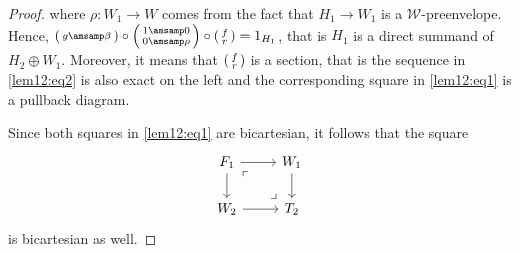 \begin{proof}
  where $\rho:W_1\to W$ comes from the fact that $H_1\to W_1$ is a $\mathcal{W}$-preenvelope. Hence,
  $
    \begin{psmallmatrix}
      g\amsamp \beta
    \end{psmallmatrix}
    \circ
    \begin{psmallmatrix}
      1 \amsamp 0\\
      0 \amsamp \rho
    \end{psmallmatrix}
    \circ
    \begin{psmallmatrix}
      f \\ r
    \end{psmallmatrix}
    = 1_{H_1}
  $, that is $H_1$ is a direct summand of $H_2\oplus W_1$. Moreover, it means that
  $
    \begin{psmallmatrix}
      f \\ r
    \end{psmallmatrix}
  $ is a section, that is the sequence in \eqref{lem12:eq2} is also exact on the left and
  the corresponding square in \eqref{lem12:eq1} is a pullback diagram.

  Since both squares in \eqref{lem12:eq1} are bicartesian, it follows that the square
  \begin{equation*}
    \begin{tikzcd}
      F_1\arrow{r}\arrow{d}
        \arrow[phantom,"\ulcorner",very near start]{dr}
        \arrow[phantom,"\lrcorner",very near end]{dr}
        & W_1\arrow{d}\\
      W_2\arrow{r}& T_2
    \end{tikzcd}
  \end{equation*}
  is bicartesian as well.
\end{proof}
